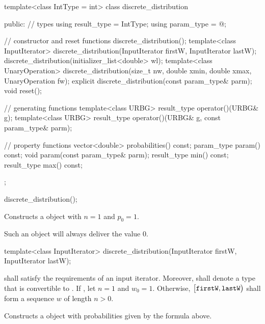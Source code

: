 %
\begin{codeblock}
template<class IntType = int>
  class discrete_distribution {
  public:
    // types
    using result_type = IntType;
    using param_type  = @\unspec@;

    // constructor and reset functions
    discrete_distribution();
    template<class InputIterator>
      discrete_distribution(InputIterator firstW, InputIterator lastW);
    discrete_distribution(initializer_list<double> wl);
    template<class UnaryOperation>
      discrete_distribution(size_t nw, double xmin, double xmax, UnaryOperation fw);
    explicit discrete_distribution(const param_type& parm);
    void reset();

    // generating functions
    template<class URBG>
      result_type operator()(URBG& g);
    template<class URBG>
      result_type operator()(URBG& g, const param_type& parm);

    // property functions
    vector<double> probabilities() const;
    param_type param() const;
    void param(const param_type& parm);
    result_type min() const;
    result_type max() const;
  };
\end{codeblock}

\begin{itemdecl}
discrete_distribution();
\end{itemdecl}

\begin{itemdescr}
\pnum\effects Constructs a  object
with $n = 1$ and $p_0 = 1$.
\begin{note}
Such an object will always deliver the value $0$.
\end{note}
\end{itemdescr}


%
\begin{itemdecl}
template<class InputIterator>
  discrete_distribution(InputIterator firstW, InputIterator lastW);
\end{itemdecl}

\begin{itemdescr}
\pnum
\requires
   shall satisfy the requirements
  of an input iterator.
  Moreover,
  shall denote a type that is convertible to .
 If ,
 let $n = 1$ and $w_0 = 1$.
 Otherwise,
 $\bigl[\texttt{firstW}, \texttt{lastW}\bigr)$
 shall form a sequence $w$ of length $n > 0$.

\pnum
\effects Constructs a  object
with probabilities given by the formula above.
\end{itemdescr}


